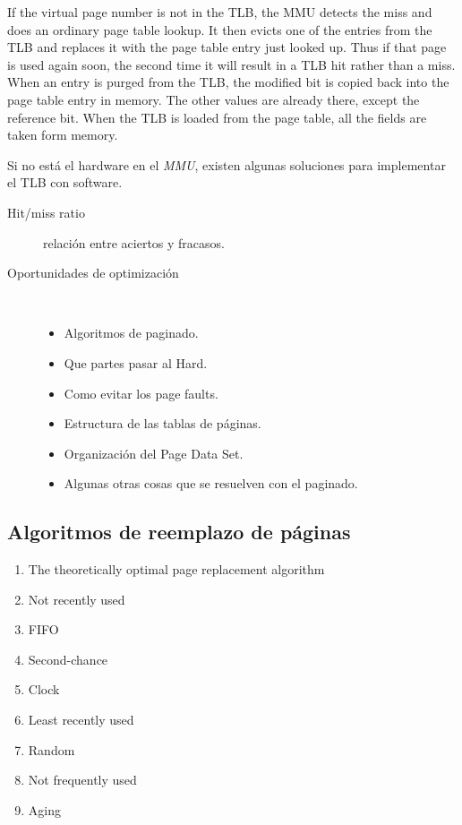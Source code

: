 \documentclass[a4paper, twoside]{article}
\begin{document}
If the virtual page number is not in the TLB, the MMU detects the miss and does
an ordinary page table lookup.
It then evicts one of the entries from the TLB and replaces it with the page
table entry just looked up. Thus if that page is used again soon, the second
time it will result in a TLB hit rather than a miss.
When an entry is purged from the TLB, the modified bit is copied back into the
page table entry in memory.
The other values are already there, except the reference bit.
When the TLB is loaded from the page table, all the fields are taken form
memory.

Si no está el hardware en el \emph{MMU}, existen algunas soluciones para
implementar el TLB con software.

\begin{description}
  \item[Hit/miss ratio] relación entre aciertos y fracasos.
  \item[Oportunidades de optimización] ~
  \begin{itemize}
    \item Algoritmos de paginado.
    \item Que partes pasar al Hard.
    \item Como evitar los page faults.
    \item Estructura de las tablas de páginas.
    \item Organización del Page Data Set.
    \item Algunas otras cosas que se resuelven con el paginado.
  \end{itemize}
\end{description}

\subsection{Algoritmos de reemplazo de páginas}

\begin{enumerate}
  \item The theoretically optimal page replacement algorithm
  \item Not recently used
  \item FIFO
  \item Second-chance
  \item Clock
  \item Least recently used
  \item Random
  \item Not frequently used
  \item Aging
\end{enumerate}
\end{document}
